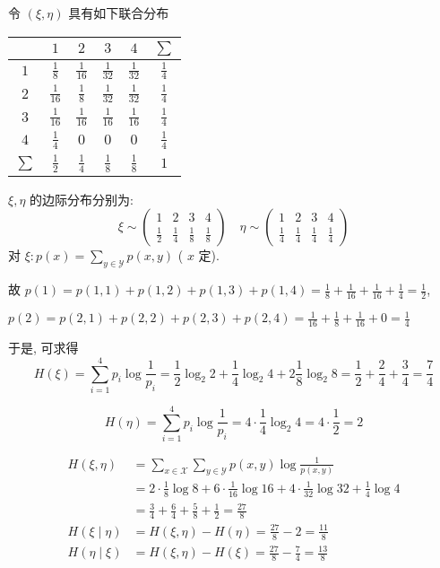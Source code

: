 \begin{example}
令 $ (\xi, \eta) $ 具有如下联合分布
\begin{table}[ht]
\centering 
\begin{tabular}{|c|cccc|c|}
\hline
\diagbox{$ \eta $}{$ \xi $}
 & $1$ & $2$ & $3$ & $4$ & $ \sum $ \\
\hline $1$ & $ \frac{1}{8} $ & $ \frac{1}{16} $ & $ \frac{1}{32} $ & $ \frac{1}{32} $ & $ \frac{1}{4} $ \\
$2$ & $ \frac{1}{16} $ & $ \frac{1}{8} $ & $ \frac{1}{32} $ & $ \frac{1}{32} $ & $ \frac{1}{4} $ \\
$3$ & $ \frac{1}{16} $ & $ \frac{1}{16} $ & $ \frac{1}{16} $ & $ \frac{1}{16} $ & $ \frac{1}{4} $ \\
$4$ & $ \frac{1}{4} $ & $0$ & $0$ & $0$ & $ \frac{1}{4} $ \\
\hline $\sum$ & $\frac{1}{2}$ & $\frac{1}{4}$ & $\frac{1}{8}$ & $\frac{1}{8}$ & $1 $ \\
\hline
\end{tabular}
\end{table}

$ \xi, \eta $ 的边际分布分别为:
$$
\xi \sim\left(\begin{array}{cccc}
1 & 2 & 3 & 4 \\
\frac{1}{2} & \frac{1}{4} & \frac{1}{8} & \frac{1}{8}
\end{array}\right) \quad \eta \sim\left(\begin{array}{cccc}
1 & 2 & 3 & 4 \\
\frac{1}{4} & \frac{1}{4} & \frac{1}{4} & \frac{1}{4}
\end{array}\right)
$$
对 $ \xi: p(x)=\sum\limits_{y \in \mathscr{Y}} p(x, y) $ ( $ x $ 定).

故 $ p(1)=p(1,1)+p(1,2)+p(1,3)+p(1,4)=\frac{1}{8}+\frac{1}{16}+\frac{1}{16}+\frac{1}{4}=\frac{1}{2} $,

$ p(2)=p(2,1)+p(2,2)+p(2,3)+p(2,4)=\frac{1}{16}+\frac{1}{8}+\frac{1}{16}+0=\frac{1}{4} $

于是, 可求得 
$$ H(\xi)=\sum_{i=1}^{4} p_{i} \log \frac{1}{p_{i}}=\frac{1}{2} \log _{2} 2+\frac{1}{4} \log _{2} 4+2 \frac{1}{8} \log _{2} 8=\frac{1}{2}+\frac{2}{4}+\frac{3}{4}=\frac{7}{4} $$

$$H(\eta)=\sum_{i=1}^{4} p_{i} \log \frac{1}{p_{i}}=4 \cdot \frac{1}{4} \log _{2} 4=4 \cdot \frac{1}{2}=2$$

$$
\begin{aligned}
H(\xi, \eta)&=\sum_{x \in \mathscr{X}} \sum_{y \in \mathscr{Y}} p(x, y) \log \frac{1}{p(x, y)} \\
&=2 \cdot \frac{1}{8} \log 8+6 \cdot \frac{1}{16} \log 16+4 \cdot \frac{1}{32} \log 32+\frac{1}{4} \log 4 \\
&=\frac{3}{4}+\frac{6}{4}+\frac{5}{8}+\frac{1}{2}=\frac{27}{8} \\
H(\xi \mid \eta)&=H(\xi, \eta)-H(\eta)=\frac{27}{8}-2=\frac{11}{8} \\
H(\eta \mid \xi)&=H(\xi, \eta)-H(\xi)=\frac{27}{8}-\frac{7}{4}=\frac{13}{8}
\end{aligned}
$$

\end{example}